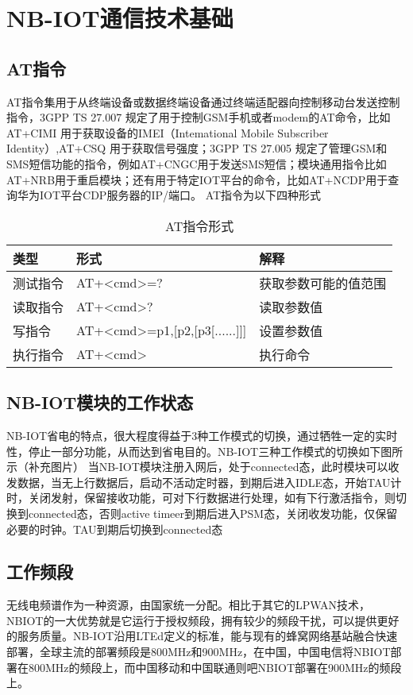 \chapter{NB-IOT通信技术基础}


\section{AT指令}
AT指令集用于从终端设备或数据终端设备通过终端适配器向控制移动台发送控制指令，3GPP TS 27.007 规定了用于控制GSM手机或者modem的AT命令，比如 AT+CIMI 用于获取设备的IMEI（Intemational Mobile Subscriber Identity）,AT+CSQ 用于获取信号强度；3GPP TS 27.005 规定了管理GSM和SMS短信功能的指令，例如AT+CNGC用于发送SMS短信；模块通用指令比如 AT+NRB用于重启模块；还有用于特定IOT平台的命令，比如AT+NCDP用于查询华为IOT平台CDP服务器的IP/端口。
AT指令为以下四种形式

\begin{table}[h!]
\caption{AT指令形式}
\begin{tabular}{lll}
\toprule
类型&形式&解释\\
\midrule
测试指令&AT+<cmd>=?&获取参数可能的值范围\\
读取指令&AT+<cmd>?&读取参数值\\
写指令&AT+<cmd>=p1,[p2,[p3[......]]]&设置参数值\\
执行指令&AT+<cmd>&执行命令\\
\bottomrule
\end{tabular}
\label{AT指令形式}
\end{table}


\section{NB-IOT模块的工作状态}
NB-IOT省电的特点，很大程度得益于3种工作模式的切换，通过牺牲一定的实时性，停止一部分功能，从而达到省电目的。NB-IOT三种工作模式的切换如下图所示（补充图片）
当NB-IOT模块注册入网后，处于connected态，此时模块可以收发数据，当无上行数据后，启动不活动定时器，到期后进入IDLE态，开始TAU计时，关闭发射，保留接收功能，可对下行数据进行处理，如有下行激活指令，则切换到connected态，否则active timeer到期后进入PSM态，关闭收发功能，仅保留必要的时钟。TAU到期后切换到connected态

\section{工作频段}
无线电频谱作为一种资源，由国家统一分配。相比于其它的LPWAN技术，NBIOT的一大优势就是它运行于授权频段，拥有较少的频段干扰，可以提供更好的服务质量。NB-IOT沿用LTEd定义的标准，能与现有的蜂窝网络基站融合快速部署，全球主流的部署频段是800MHz和900MHz，在中国，中国电信将NBIOT部署在800MHz的频段上，而中国移动和中国联通则吧NBIOT部署在900MHz的频段上。


